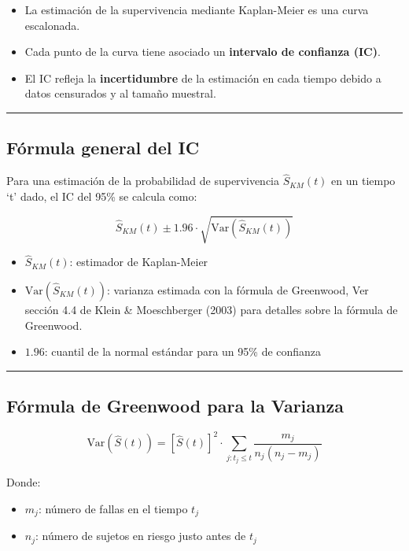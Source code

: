 \documentclass[
]{article}
\providecommand{\tightlist}{%
  \setlength{\itemsep}{0pt}\setlength{\parskip}{0pt}}
\begin{document}
\begin{itemize}
\tightlist
\item
  La estimación de la supervivencia mediante Kaplan-Meier es una curva
  escalonada.
\item
  Cada punto de la curva tiene asociado un \textbf{intervalo de
  confianza (IC)}.
\item
  El IC refleja la \textbf{incertidumbre} de la estimación en cada
  tiempo debido a datos censurados y al tamaño muestral.
\end{itemize}

\begin{center}\rule{0.5\linewidth}{0.5pt}\end{center}

\subsection{Fórmula general del IC}\label{fuxf3rmula-general-del-ic}

Para una estimación de la probabilidad de supervivencia
\(\hat{S}_{KM}(t)\) en un tiempo `t' dado, el IC del 95\% se calcula
como:

\[
\hat{S}_{KM}(t) \pm 1.96 \cdot \sqrt{\text{Var}(\hat{S}_{KM}(t))}
\]

\begin{itemize}
\tightlist
\item
  \(\hat{S}_{KM}(t)\): estimador de Kaplan-Meier
\item
  \(\text{Var}(\hat{S}_{KM}(t))\): varianza estimada con la fórmula de
  Greenwood, Ver sección 4.4 de Klein \& Moeschberger (2003) para
  detalles sobre la fórmula de Greenwood.
\item
  \(1.96\): cuantil de la normal estándar para un 95\% de confianza
\end{itemize}

\begin{center}\rule{0.5\linewidth}{0.5pt}\end{center}

\subsection{Fórmula de Greenwood para la
Varianza}\label{fuxf3rmula-de-greenwood-para-la-varianza}

\[
\text{Var}(\hat{S}(t)) = [\hat{S}(t)]^2 \cdot \sum_{j: t_j \leq t} \frac{m_j}{n_j(n_j - m_j)}
\]

Donde:

\begin{itemize}
\tightlist
\item
  \(m_j\): número de fallas en el tiempo \(t_j\)
\item
  \(n_j\): número de sujetos en riesgo justo antes de \(t_j\)
\end{itemize}
\end{document}
